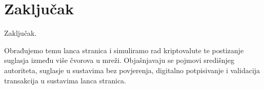 \documentclass[utf8, zavrsni]{fer}
\begin{document}




\chapter{Zaključak}
Zaključak.





\begin{sazetak}
	Obrađujemo temu lanca stranica i simuliramo rad kriptovalute te postizanje suglasja između više čvorova u mreži. Objašnjavaju se pojmovi središnjeg autoriteta, suglasje u sustavima bez povjerenja, digitalno potpisivanje i validacija transakcija u sustavima lanca stranica.

\end{sazetak}

\begin{abstract}
	
\end{abstract}
\end{document}
